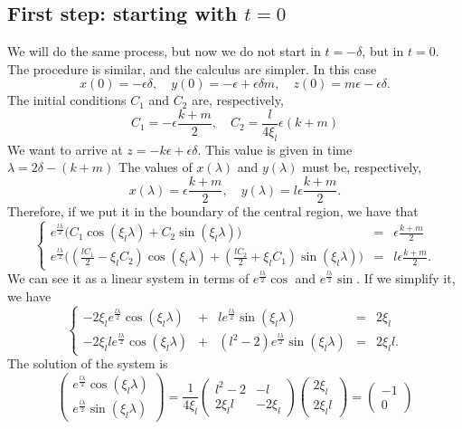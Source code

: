 \documentclass[a4paper,preprint,11pt]{article}
\begin{document}
\subsection{First step: starting with $t=0$}
We will do the same process, but now we do not start in $t=-\delta$, but in $t=0$. The procedure is similar, and the calculus are simpler. In this case
$$
x(0) = -\epsilon\delta, \quad
y(0) = -\epsilon + \epsilon\delta m, \quad
z(0) = m\epsilon - \epsilon\delta.
$$
The initial conditions $C_1$ and $C_2$ are, respectively,
$$
C_1 = -\epsilon\frac{k+m}{2}, \quad
C_2 = \frac{l}{4\xi_l}\epsilon(k+m)
$$
We want to arrive at $z=-k\epsilon+\epsilon\delta$. This value is given in time $\boxed{\lambda=2\delta-(k+m)}$ The values of $x(\lambda)$ and $y(\lambda)$ must be, respectively,
$$
x(\lambda) = \epsilon\frac{k+m}{2}, \quad
y(\lambda) = l\epsilon\frac{k+m}{2}.
$$
Therefore, if we put it in the boundary of the central region, we have that
$$
\left\{
\begin{array}{lcl}
e^{\frac{l\lambda}{2}}\big(C_1\cos(\xi_l\lambda)+C_2\sin(\xi_l\lambda)\big) & = & \epsilon\frac{k+m}{2} \\
e^{\frac{l\lambda}{2}}\Big((\frac{lC_1}{2}-\xi_lC_2)\cos(\xi_l\lambda) + (\frac{lC_2}{2}+\xi_lC_1)\sin(\xi_l\lambda) \Big) & = & l\epsilon\frac{k+m}{2}.
\end{array}
\right.
$$
We can see it as a linear system in terms of $e^{\frac{l\lambda}{2}}\cos$ and $e^{\frac{l\lambda}{2}}\sin$. If we simplify it, we have
$$
\left\{
\begin{array}{rcrcl}
-2\xi_le^{\frac{l\lambda}{2}}\cos(\xi_l\lambda) & + & le^{\frac{l\lambda}{2}}\sin(\xi_l\lambda) & = & 2\xi_l \\
-2\xi_lle^{\frac{l\lambda}{2}}\cos(\xi_l\lambda) & + & (l^2-2)e^{\frac{l\lambda}{2}}\sin(\xi_l\lambda) & = & 2\xi_ll.
\end{array}
\right.
$$
The solution of the system is
$$
\begin{pmatrix}
e^{\frac{l\lambda}{2}}\cos(\xi_l\lambda) \\ 
e^{\frac{l\lambda}{2}}\sin(\xi_l\lambda)
\end{pmatrix}
=
\frac{1}{4\xi_l}
\begin{pmatrix}
l^2-2 & -l \\
2\xi_ll & -2\xi_l
\end{pmatrix}
\begin{pmatrix}
2\xi_l \\
2\xi_ll
\end{pmatrix}
=
\begin{pmatrix}
 -1 \\ 0
\end{pmatrix}
$$
\end{document}
